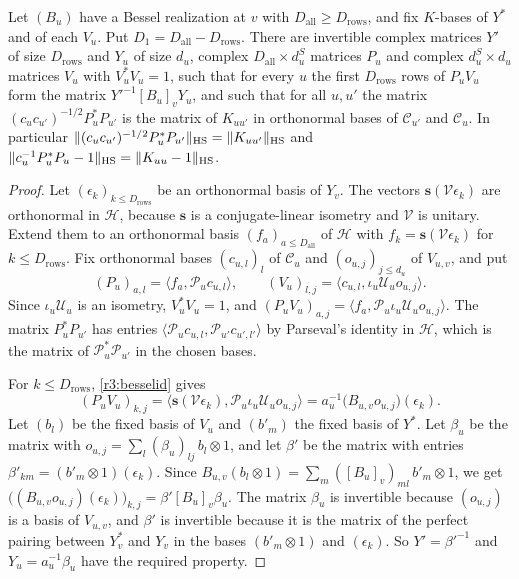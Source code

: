 \begin{lemma}\label{r3:block}
Let $(B_u)$ have a Bessel realization at $v$ with $D_{\mathrm{all}}\ge D_{\mathrm{rows}}$, and fix $K$-bases of $Y^*$ and of each $V_u$. Put $D_1=D_{\mathrm{all}}-D_{\mathrm{rows}}$. There are invertible complex matrices $Y'$ of size $D_{\mathrm{rows}}$ and $Y_u$ of size $d_u$, complex $D_{\mathrm{all}}\times d^S_u$ matrices $P_u$ and complex $d^S_u\times d_u$ matrices $V_u$ with $V_u^*V_u=1$, such that for every $u$ the first $D_{\mathrm{rows}}$ rows of $P_uV_u$ form the matrix $Y'^{-1}[B_u]_vY_u$, and such that for all $u,u'$ the matrix $(c_uc_{u'})^{-1/2}P_u^*P_{u'}$ is the matrix of $K_{uu'}$ in orthonormal bases of $\mathcal C_{u'}$ and $\mathcal C_u$. In particular $\lVert(c_uc_{u'})^{-1/2}P_u^*P_{u'}\rVert_{\mathrm{HS}}=\lVert K_{uu'}\rVert_{\mathrm{HS}}$ and $\lVert c_u^{-1}P_u^*P_u-1\rVert_{\mathrm{HS}}=\lVert K_{uu}-1\rVert_{\mathrm{HS}}$.
\end{lemma}

\begin{proof}
Let $(\epsilon_k)_{k\le D_{\mathrm{rows}}}$ be an orthonormal basis of $Y_v$. The vectors $\mathbf s(\mathcal V\epsilon_k)$ are orthonormal in $\mathcal H$, because $\mathbf s$ is a conjugate-linear isometry and $\mathcal V$ is unitary. Extend them to an orthonormal basis $(f_a)_{a\le D_{\mathrm{all}}}$ of $\mathcal H$ with $f_k=\mathbf s(\mathcal V\epsilon_k)$ for $k\le D_{\mathrm{rows}}$. Fix orthonormal bases $(c_{u,l})_l$ of $\mathcal C_u$ and $(o_{u,j})_{j\le d_u}$ of $V_{u,v}$, and put
\[
(P_u)_{a,l}=\langle f_a,\mathcal P_uc_{u,l}\rangle,\qquad(V_u)_{l,j}=\langle c_{u,l},\iota_u\mathcal U_uo_{u,j}\rangle .
\]
Since $\iota_u\mathcal U_u$ is an isometry, $V_u^*V_u=1$, and $(P_uV_u)_{a,j}=\langle f_a,\mathcal P_u\iota_u\mathcal U_uo_{u,j}\rangle$. The matrix $P_u^*P_{u'}$ has entries $\langle\mathcal P_uc_{u,l},\mathcal P_{u'}c_{u',l'}\rangle$ by Parseval's identity in $\mathcal H$, which is the matrix of $\mathcal P_u^*\mathcal P_{u'}$ in the chosen bases.

For $k\le D_{\mathrm{rows}}$, \eqref{r3:besselid} gives
\[
(P_uV_u)_{k,j}=\big\langle\mathbf s(\mathcal V\epsilon_k),\mathcal P_u\iota_u\mathcal U_uo_{u,j}\big\rangle=a_u^{-1}\big(B_{u,v}o_{u,j}\big)(\epsilon_k).
\]
Let $(b_l)$ be the fixed basis of $V_u$ and $(b'_m)$ the fixed basis of $Y^*$. Let $\beta_u$ be the matrix with $o_{u,j}=\sum_l(\beta_u)_{lj}\,b_l\otimes1$, and let $\beta'$ be the matrix with entries $\beta'_{km}=(b'_m\otimes1)(\epsilon_k)$. Since $B_{u,v}(b_l\otimes1)=\sum_m([B_u]_v)_{ml}\,b'_m\otimes1$, we get $\big((B_{u,v}o_{u,j})(\epsilon_k)\big)_{k,j}=\beta'[B_u]_v\beta_u$. The matrix $\beta_u$ is invertible because $(o_{u,j})$ is a basis of $V_{u,v}$, and $\beta'$ is invertible because it is the matrix of the perfect pairing between $Y^*_v$ and $Y_v$ in the bases $(b'_m\otimes1)$ and $(\epsilon_k)$. So $Y'=\beta'^{-1}$ and $Y_u=a_u^{-1}\beta_u$ have the required property.
\end{proof}

